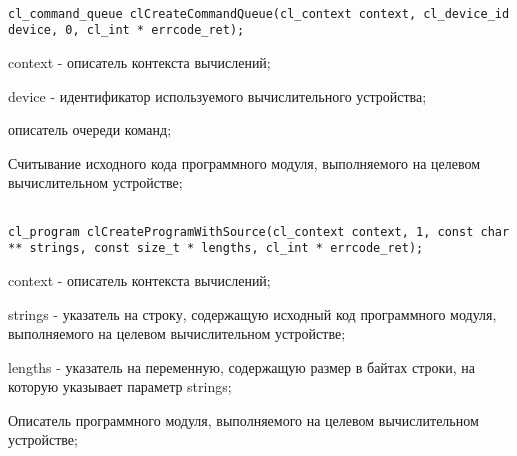 \begin{enumerate}

		
\begin{lstlisting}

cl_command_queue clCreateCommandQueue(cl_context context, cl_device_id device, 0, cl_int * errcode_ret);

\end{lstlisting}

		\openclend
		{
			\item context - описатель контекста вычислений;
			\item device - идентификатор используемого вычислительного устройства;
			\errcode
		}
		{описатель очереди команд;}


		\item Считывание исходного кода программного модуля, выполняемого на целевом вычислительном устройстве;



\begin{lstlisting}

cl_program clCreateProgramWithSource(cl_context context, 1, const char ** strings, const size_t * lengths, cl_int * errcode_ret);

\end{lstlisting}

		\openclend
		{
			\item context - описатель контекста вычислений;
			\item strings - указатель на строку, содержащую исходный код программного модуля, выполняемого на целевом вычислительном устройстве;
			\item lengths - указатель на переменную, содержащую размер в байтах строки, на которую указывает параметр strings;
			\errcode
		}
		{Описатель программного модуля, выполняемого на целевом вычислительном устройстве;}


\end{enumerate}
